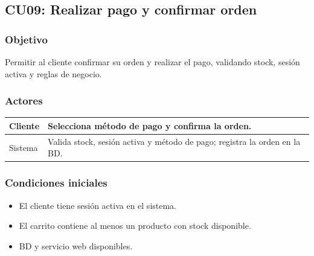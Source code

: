 \documentclass[12pt,a4paper]{article}
\begin{document}

\subsection{CU09: Realizar pago y confirmar orden}
\subsubsection*{Objetivo}
Permitir al cliente confirmar su orden y realizar el pago, validando stock, sesión activa y reglas de negocio.

\subsubsection*{Actores}
\begin{longtable}{|l|p{10cm}|}
    \hline
    Cliente & Selecciona método de pago y confirma la orden.                            \\ \hline
    Sistema & Valida stock, sesión activa y método de pago; registra la orden en la BD. \\ \hline
\end{longtable}

\subsubsection*{Condiciones iniciales}
\begin{itemize}[label=--]
    \item El cliente tiene sesión activa en el sistema.
    \item El carrito contiene al menos un producto con stock disponible.
    \item BD y servicio web disponibles.
\end{itemize}
\end{document}
